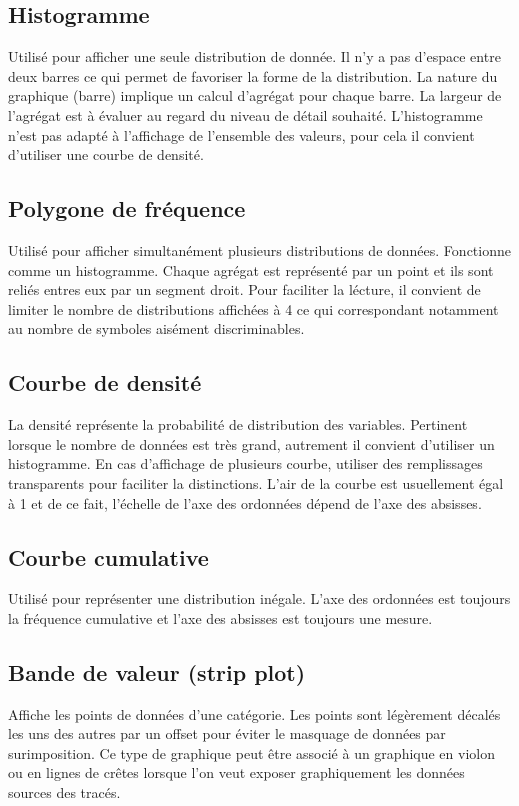 \documentclass[a4paper,12pt]{article}
\begin{document}
\begin{multicols}{2}
\subsection*{Histogramme}
\label{sec:orgc6d5c0c}
Utilisé pour afficher une seule distribution de donnée. Il n'y a pas d'espace entre deux barres ce qui permet de favoriser la forme de la distribution. La nature du graphique (barre) implique un calcul d'agrégat pour chaque barre. La largeur de l'agrégat est à évaluer au regard du niveau de détail souhaité. L'histogramme n'est pas adapté à l'affichage de l'ensemble des valeurs, pour cela il convient d'utiliser une courbe de densité.
\subsection*{Polygone de fréquence}
\label{sec:org6dd48cd}
Utilisé pour afficher simultanément plusieurs distributions de données. Fonctionne comme un histogramme. Chaque agrégat est représenté par un point et ils sont reliés entres eux par un segment droit. Pour faciliter la lécture, il convient de limiter le nombre de distributions affichées à 4 ce qui correspondant notamment au nombre de symboles aisément discriminables.
\subsection*{Courbe de densité}
\label{sec:orgffad9a8}
La densité représente la probabilité de distribution des variables.\autocite{sosulskiIIIGraphics2019} Pertinent lorsque le nombre de données est très grand, autrement il convient d'utiliser un histogramme.\autocite{wilke9VisualizingMany2019} En cas d'affichage de plusieurs courbe, utiliser  des remplissages transparents pour faciliter la distinctions. L'air de la courbe est usuellement égal à 1 et de ce fait, l'échelle de l'axe des ordonnées dépend de l'axe des absisses.\autocite{wilke9VisualizingMany2019}
\subsection*{Courbe cumulative}
\label{sec:org3897805}
Utilisé pour représenter une distribution inégale. L'axe des ordonnées est toujours la fréquence cumulative et l'axe des absisses est toujours une mesure.
\subsection*{Bande de valeur (strip plot)}
\label{sec:org49805aa}
Affiche les points de données d'une catégorie. Les points sont légèrement décalés les uns des autres par un offset pour éviter le masquage de données par surimposition. Ce type de graphique peut être associé à un graphique en violon ou en lignes de crêtes lorsque l'on veut exposer graphiquement les données sources des tracés.\autocite{wilke9VisualizingMany2019}

\end{multicols}
\end{document}
